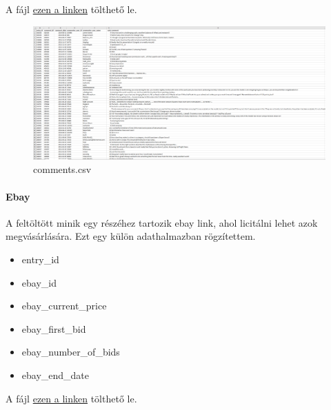 \documentclass[14pt,a4paper]{article}
\begin{document}
A fájl
\href{https://raw.githubusercontent.com/nemkin/cool-mini-or-not/main/data/cool\_mini\_or\_not\_comments.csv}{ezen a linken}
tölthető le.

\begin{figure}[H]
\centering
\includegraphics[width=1.0\columnwidth]{pics/csv_comments.png}
\caption{comments.csv}
\end{figure}

\paragraph{Ebay}

A feltöltött minik egy részéhez tartozik ebay link, ahol licitálni lehet azok megvásárlására. Ezt egy külön
adathalmazban rögzítettem.

\begin{itemize}
\item entry\_id
\item ebay\_id
\item ebay\_current\_price
\item ebay\_first\_bid
\item ebay\_number\_of\_bids
\item ebay\_end\_date
\end{itemize}

A fájl
\href{https://raw.githubusercontent.com/nemkin/cool-mini-or-not/main/data/cool\_mini\_or\_not\_ebay.csv}{ezen a linken}
tölthető le.
\end{document}
